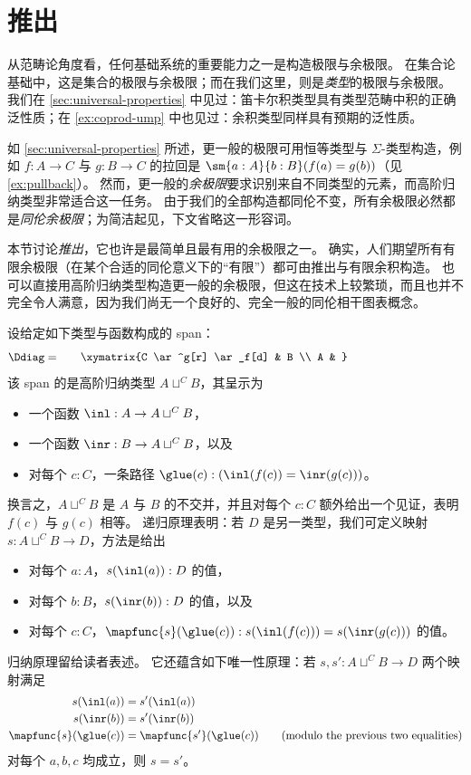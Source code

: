 %

\section{推出}
\label{sec:colimits}

%
%
%
%
从范畴论角度看，任何基础系统的重要能力之一是构造极限与余极限。
在集合论基础中，这是集合的极限与余极限；而在我们这里，则是\emph{类型}的极限与余极限。
我们在 \cref{sec:universal-properties} 中见过：笛卡尔积类型具有类型范畴中积的正确泛性质；在 \cref{ex:coprod-ump} 中也见过：余积类型同样具有预期的泛性质。

如 \cref{sec:universal-properties} 所述，更一般的极限可用恒等类型与 $\Sigma$-类型构造，例如 $f:A\to C$ 与 $g:B\to C$ 的拉回是 $\sm{a:A}{b:B} (f(a)=g(b))$（见 \cref{ex:pullback}）。
然而，更一般的\emph{余极限}要求识别来自不同类型的元素，而高阶归纳类型非常适合这一任务。
由于我们的全部构造都同伦不变，所有余极限必然都是\emph{同伦余极限}；为简洁起见，下文省略这一形容词。

本节讨论\emph{推出}，它也许是最简单且最有用的余极限之一。
确实，人们期望所有有限余极限（在某个合适的同伦意义下的“有限”）都可由推出与有限余积构造。
也可以直接用高阶归纳类型构造更一般的余极限，但这在技术上较繁琐，而且也并不完全令人满意，因为我们尚无一个良好的、完全一般的同伦相干图表概念。

%
%
%
设给定如下类型与函数构成的 span：
\[\Ddiag=\;\vcenter{\xymatrix{C \ar^g[r] \ar_f[d] & B \\ A & }}\]
该 span 的是高阶归纳类型 $A\sqcup^CB$，其呈示为
\begin{itemize}
\item 一个函数 $\inl:A\to A\sqcup^CB$，
\item 一个函数 $\inr:B \to A\sqcup^CB$，以及
\item 对每个 $c:C$，一条路径 $\glue(c):(\inl(f(c))=\inr(g(c)))$。
\end{itemize}
换言之，$A\sqcup^CB$ 是 $A$ 与 $B$ 的不交并，并且对每个 $c:C$ 额外给出一个见证，表明 $f(c)$ 与 $g(c)$ 相等。
递归原理表明：若 $D$ 是另一类型，我们可定义映射 $s:A\sqcup^CB\to{}D$，方法是给出
\begin{itemize}
\item 对每个 $a:A$，$s(\inl(a)):D$ 的值，
\item 对每个 $b:B$，$s(\inr(b)):D$ 的值，以及
\item 对每个 $c:C$，$\mapfunc{s}(\glue(c)):s(\inl(f(c)))=s(\inr(g(c)))$ 的值。
\end{itemize}
归纳原理留给读者表述。
它还蕴含如下唯一性原理：若 $s,s':A\sqcup^CB\to{}D$ 两个映射满足
%
\begin{align*}
  s(\inl(a))&=s'(\inl(a))\\
  s(\inr(b))&=s'(\inr(b))\\
  \mapfunc{s}(\glue(c))&=\mapfunc{s'}(\glue(c))
  \qquad\text{(modulo the previous two equalities)}
\end{align*}
对每个 $a,b,c$ 均成立，则 $s=s'$。

